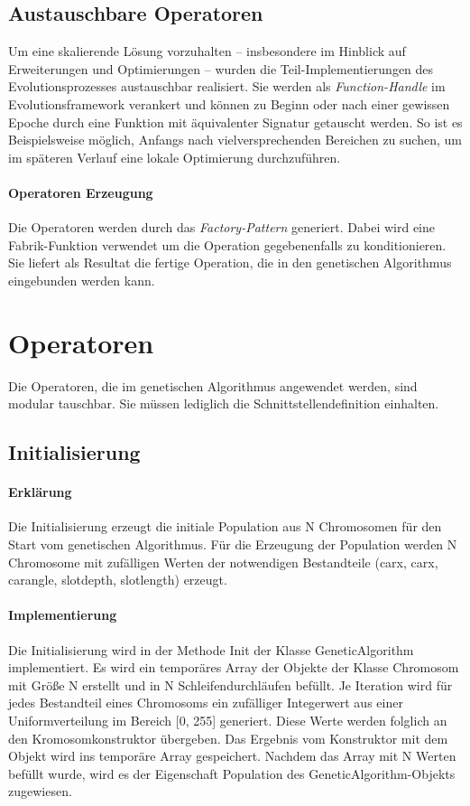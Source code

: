 \documentclass[12pt,a4paper]{scrartcl}
\begin{document}
\subsection{Austauschbare Operatoren}\label{sec:op}
Um eine skalierende Lösung vorzuhalten -- insbesondere im Hinblick auf Erweiterungen und Optimierungen -- wurden die Teil-Implementierungen des Evolutionsprozesses austauschbar realisiert. Sie werden als \emph{Function-Handle} im Evolutionsframework verankert und können zu Beginn oder nach einer gewissen Epoche durch eine Funktion mit äquivalenter Signatur getauscht werden. So ist es Beispielsweise möglich, Anfangs nach vielversprechenden Bereichen zu suchen, um im späteren Verlauf eine lokale Optimierung durchzuführen.

\paragraph{Operatoren Erzeugung} Die Operatoren werden durch das \emph{Factory-Pattern} generiert. Dabei wird eine Fabrik-Funktion verwendet um die Operation gegebenenfalls zu konditionieren. Sie liefert als Resultat die fertige Operation, die in den genetischen Algorithmus eingebunden werden kann.

\section{Operatoren}
Die Operatoren, die im genetischen Algorithmus angewendet werden, sind modular tauschbar. Sie müssen lediglich die Schnittstellendefinition einhalten.

\subsection{Initialisierung}
\paragraph{Erklärung}
Die Initialisierung erzeugt die initiale Population aus N Chromosomen für den Start vom genetischen Algorithmus. Für die Erzeugung der Population werden N Chromosome mit zufälligen Werten der notwendigen Bestandteile (carx, carx, carangle, slotdepth, slotlength) erzeugt. 

\paragraph{Implementierung}
Die Initialisierung wird in der Methode Init der Klasse GeneticAlgorithm implementiert. Es wird ein temporäres Array der Objekte der Klasse Chromosom  mit Größe N erstellt und in N Schleifendurchläufen befüllt. Je Iteration wird für jedes Bestandteil eines Chromosoms ein zufälliger Integerwert aus einer Uniformverteilung im Bereich [0, 255] generiert. Diese Werte werden folglich an den Kromosomkonstruktor übergeben. Das Ergebnis vom Konstruktor mit dem Objekt wird ins temporäre Array gespeichert. Nachdem das Array mit N Werten befüllt wurde, wird es der Eigenschaft Population des GeneticAlgorithm-Objekts zugewiesen.
\end{document}
